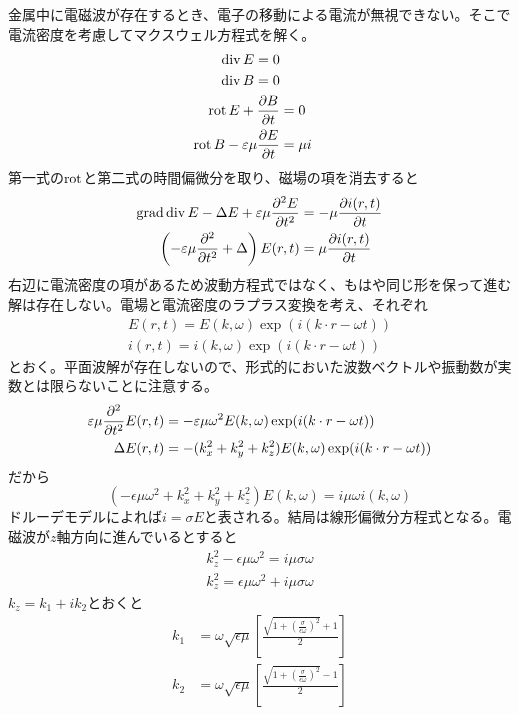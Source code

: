    金属中に電磁波が存在するとき、電子の移動による電流が無視できない。そこで電流密度を考慮してマクスウェル方程式を解く。
    \begin{align*}
        \div E = 0\\
        \div B = 0\\
        \rot E + \pd[B]{t} &= 0\\
        \rot B - \epsilon\mu\pd[E]{t} &= \mu i
    \end{align*}
    第一式の$\rot$と第二式の時間偏微分を取り、磁場の項を消去すると
    \begin{align*}
        \grad\div E - \Delta E + \epsilon\mu\pdv[2]{E}{t} &= - \mu \pd[i(r, t)]{t}\\
        \left(-\epsilon\mu\pdv[2]{t} + \Delta\right)E(r, t) &= \mu\pd[i(r, t)]{t}
    \end{align*}
    右辺に電流密度の項があるため波動方程式ではなく、もはや同じ形を保って進む解は存在しない。電場と電流密度のラプラス変換を考え、それぞれ
    \begin{align*}
        E(r, t) = E(k, \omega)\exp(i(k \cdot r - \omega t))\\
        i(r, t) = i(k, \omega)\exp(i(k \cdot r - \omega t))
    \end{align*}
    とおく。平面波解が存在しないので、形式的においた波数ベクトルや振動数が実数とは限らないことに注意する。
    \begin{align*}
        \epsilon\mu\pdv[2]{t}E(r, t) &= -\epsilon\mu\omega^2 E(k, \omega)\exp(i(k \cdot r - \omega t))\\
        \Delta E(r, t) &= - (k_x^2 + k_y^2 + k_z^2)E(k, \omega)\exp(i(k \cdot r - \omega t))
    \end{align*}
    だから
        \[(-\epsilon\mu\omega^2 + k_x^2 + k_y^2 + k_z^2)E(k, \omega) = i\mu\omega i(k, \omega)\]
    ドルーデモデルによれば$i = \sigma E$と表される。結局は線形偏微分方程式となる。電磁波が$z$軸方向に進んでいるとすると
    \begin{align*}
        k_z^2 - \epsilon\mu\omega^2 = i\mu\sigma\omega\\
        k_z^2 = \epsilon\mu\omega^2 + i\mu\sigma\omega
    \end{align*}
    $k_z = k_1 + ik_2$とおくと
    \begin{align*}
        k_1 &= \omega\sqrt{\epsilon\mu}\left[\frac{\sqrt{1 + \left(\frac{\sigma}{\epsilon\omega}\right)^2} + 1}{2}\right]\\
        k_2 &= \omega\sqrt{\epsilon\mu}\left[\frac{\sqrt{1 + \left(\frac{\sigma}{\epsilon\omega}\right)^2} - 1}{2}\right]
    \end{align*}

